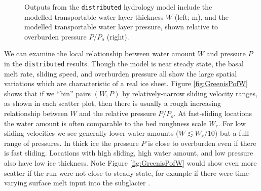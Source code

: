 \documentclass[gmd]{copernicus}   %
\begin{document}
\begin{figure}[ht]
\caption{Outputs from the \texttt{distributed} hydrology model include the modelled transportable water layer thickness $W$ (left; $\mathrm{m}$), and the modelled transportable water layer pressure, shown relative to overburden pressure $P/P_o$ (right).}
\label{fig:Greendistributedresults}
\end{figure}

We can examine the local relationship between water amount $W$ and pressure $P$ in the \texttt{distributed} results.  Though the model is near steady state, the basal melt rate, sliding speed, and overburden pressure all show the large spatial variations which are characteristic of a real ice sheet.  Figure \ref{fig:GreenisPofW} shows that if we ``bin'' pairs $(W,P)$ by relatively-narrow sliding velocity ranges, as shown in each scatter plot, then there is usually a rough increasing relationship between $W$ and the relative pressure $P/P_o$.  At fast-sliding locations the water amount is often comparable to the bed roughness scale $W_r$.  For low sliding velocities we see generally lower water amounts ($W \lesssim W_r/10$) but a full range of pressures.  In thick ice the pressure $P$ is close to overburden even if there is fast sliding.  Locations with high sliding, high water amount, and low pressure also have low ice thickness.  Note Figure \ref{fig:GreenisPofW} would show even more scatter if the run were not close to steady state, for example if there were time-varying surface melt input into the subglacier \citep{vanPeltthesis}.
\end{document}
